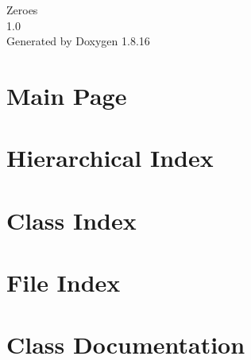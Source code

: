 \let\mypdfximage\pdfximage\def\pdfximage{\immediate\mypdfximage}\documentclass[twoside]{book}
\newcommand{\+}{\discretionary{\mbox{\scriptsize$\hookleftarrow$}}{}{}}
\newcommand{\clearemptydoublepage}{%
  \newpage{\pagestyle{empty}\cleardoublepage}%
}
\begin{document}
\hypersetup{pageanchor=false,
             bookmarksnumbered=true,
             pdfencoding=unicode
            }
\begin{titlepage}
\vspace*{7cm}
\begin{center}%
{\Large Zeroes \\[1ex]\large 1.\+0 }\\
\vspace*{1cm}
{\large Generated by Doxygen 1.8.16}\\
\end{center}
\end{titlepage}
\clearemptydoublepage
{}
\tableofcontents
\clearemptydoublepage
{}
\hypersetup{pageanchor=true}

\chapter{Main Page}
\label{index}\hypertarget{index}{}
\chapter{Hierarchical Index}

\chapter{Class Index}

\chapter{File Index}

\chapter{Class Documentation}


































\end{document}
